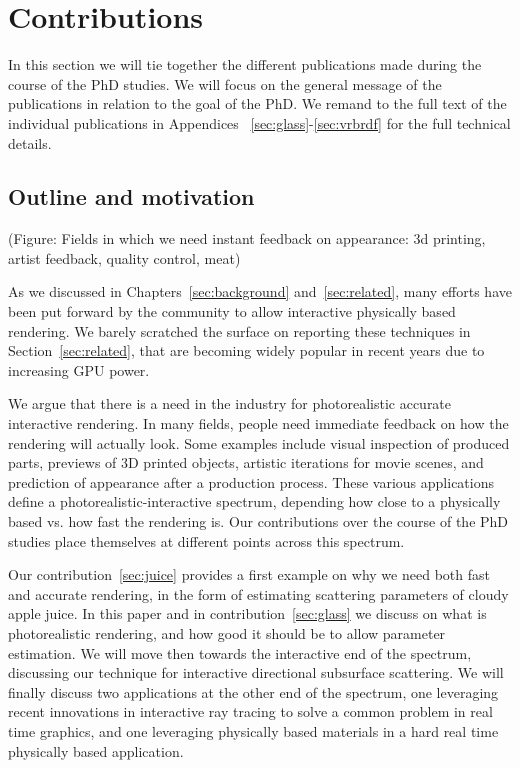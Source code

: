 \chapter{Contributions}
\label{sec:contributions}

In this section we will tie together the different publications made during the course of the PhD studies. We will focus on the general message of the publications in relation to the goal of the PhD. We remand to the full text of the individual publications in Appendices~ \ref{sec:glass}-\ref{sec:vrbrdf} for the full technical details.

\section{Outline and motivation}

(Figure: Fields in which we need instant feedback on appearance: 3d printing, artist feedback, quality control, meat)

As we discussed in Chapters~\ref{sec:background} and~\ref{sec:related}, many efforts have been put forward by the community to allow interactive physically based rendering. We barely scratched the surface on reporting these techniques in Section~\ref{sec:related}, that are becoming widely popular in recent years due to increasing GPU power. 

We argue that there is a need in the industry for photorealistic accurate interactive rendering. In many fields, people need immediate feedback on how the rendering will actually look. Some examples include visual inspection of produced parts, previews of 3D printed objects, artistic iterations for movie scenes, and prediction of appearance after a production process. These various applications define a photorealistic-interactive spectrum, depending how close to a physically based vs. how fast the rendering is. Our contributions over the course of the PhD studies place themselves at different points across this spectrum.

Our contribution~\ref{sec:juice} provides a first example on why we need both fast and accurate rendering, in the form of estimating scattering parameters of cloudy apple juice. In this paper and in contribution~\ref{sec:glass} we discuss on what is photorealistic rendering, and how good it should be to allow parameter estimation. We will move then towards the interactive end of the spectrum, discussing our technique for interactive directional subsurface scattering. We will finally discuss two applications at the other end of the spectrum, one leveraging recent innovations in interactive ray tracing to solve a common problem in real time graphics, and one leveraging physically based materials in a hard real time physically based application. 

